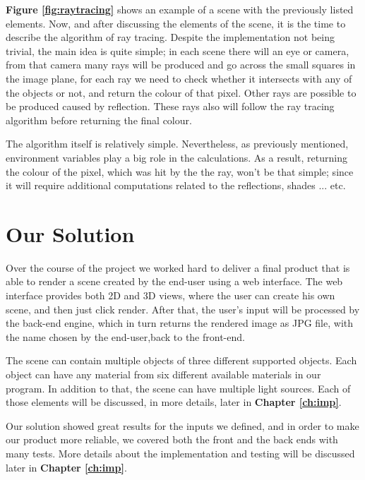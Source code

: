 \documentclass[a4paper]{report}
\begin{document}
	\par \textbf{Figure \ref{fig:raytracing}} shows an example of a scene with the previously listed elements. Now, and after discussing the elements of the scene, it is the time to describe the algorithm of ray tracing. Despite the implementation not being trivial, the main idea is quite simple; in each scene there will an eye or camera, from that camera many rays will be produced and go across the small squares in the image plane, for each ray we need to check whether it intersects with any of the objects or not, and return the colour of that pixel. Other rays are possible to be produced caused by reflection. These rays also will follow the ray tracing algorithm before returning the final colour.\\
	\par The algorithm itself is relatively simple. Nevertheless, as previously mentioned, environment variables play a big role in the calculations. As a result, returning the colour of the pixel, which was hit by the the ray, won't be that simple; since it will require additional computations related to the reflections, shades ... etc. 
	
	\section{Our Solution}
	Over the course of the project we worked hard to deliver a final product that is able to render a scene created by the end-user using a web interface. The web interface provides both 2D and 3D views, where the user can create his own scene, and then just click render. After that, the user's input will be processed by the back-end engine, which in turn returns the rendered image as JPG file, with the name chosen by the end-user,back to the front-end.\\ 
	\par The scene can contain multiple objects of three different supported objects. Each object can have any material from six different available materials in our program. In addition to that, the scene can have multiple light sources. Each of those elements will be discussed, in more details, later in \textbf{Chapter \ref{ch:imp}}.\\
	\par Our solution showed great results for the inputs we defined, and in order to make our product more reliable, we covered both the front and the back ends with many tests. More details about the implementation and testing will be discussed later in \textbf{Chapter \ref{ch:imp}}.
\end{document}
